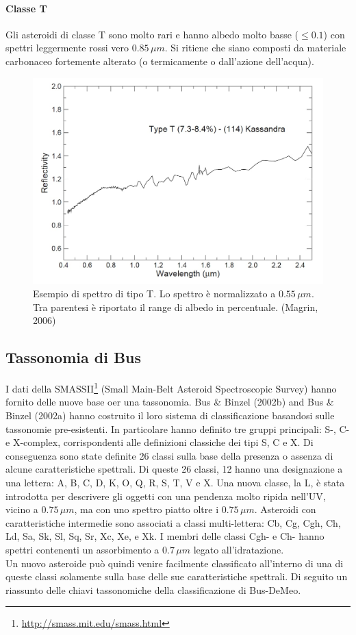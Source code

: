 \documentclass[a4paper,11pt,openright]{book}
\begin{document}
\paragraph*{Classe T}
Gli asteroidi di classe T sono molto rari e hanno albedo molto basse ($\leq 0.1$) con spettri leggermente rossi vero $0.85\,\mu m$. Si ritiene che siano composti da materiale carbonaceo fortemente
alterato (o termicamente o dall'azione dell'acqua).

\begin{figure}
    \centering
    \includegraphics[scale=0.3]{figure/spettro_t.jpg}
    \caption{Esempio di spettro di tipo T. Lo spettro è normalizzato a $0.55\,\mu m$. Tra parentesi è riportato il range di albedo in percentuale. (Magrin, 2006)}
    \label{spettro_t}
\end{figure}

\subsection{Tassonomia di Bus}
I dati della SMASSII\footnote{\href{http://smass.mit.edu/smass.html}{http://smass.mit.edu/smass.html}} (Small Main-Belt Asteroid Spectroscopic Survey) hanno fornito delle nuove base oer una tassonomia. Bus \& Binzel (2002b) and Bus \& Binzel (2002a) hanno costruito il loro sistema di classificazione basandosi sulle tassonomie pre-esistenti. In particolare hanno definito tre gruppi principali: S-, C- e X-complex, corrispondenti alle definizioni classiche dei tipi S, C e X. Di conseguenza sono state definite 26 classi sulla base della presenza o assenza di alcune caratteristiche spettrali. Di queste 26 classi, 12 hanno una designazione a una lettera: A, B, C, D, K, O, Q, R, S, T, V e X. Una nuova classe, la L, è stata introdotta per descrivere gli oggetti con una pendenza molto ripida nell'UV, vicino a $0.75\,\mu m$, ma con uno spettro piatto oltre i $0.75\,\mu m$. Asteroidi con caratteristiche intermedie sono associati a classi multi-lettera: Cb, Cg, Cgh, Ch, Ld, Sa, Sk, Sl, Sq, Sr, Xc, Xe, e Xk. I membri delle classi Cgh- e Ch- hanno spettri contenenti un assorbimento a $0.7\,\mu m$ legato all'idratazione.\\
Un nuovo asteroide può quindi venire facilmente classificato all’interno di una di queste classi solamente sulla base delle sue caratteristiche spettrali. Di seguito un riassunto delle chiavi tassonomiche della classificazione di Bus-DeMeo.
\end{document}
